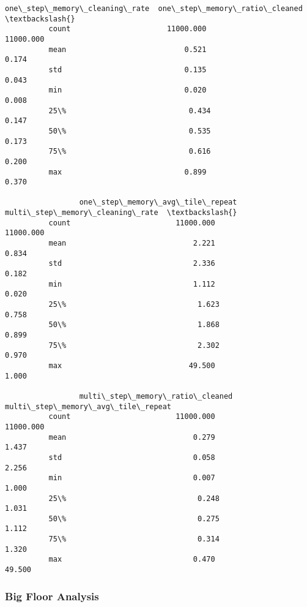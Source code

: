 \documentclass[11pt]{article}
\begin{document}
\begin{Verbatim}[commandchars=\\\{\}]
                 one\_step\_memory\_cleaning\_rate  one\_step\_memory\_ratio\_cleaned  \textbackslash{}
          count                      11000.000                      11000.000   
          mean                           0.521                          0.174   
          std                            0.135                          0.043   
          min                            0.020                          0.008   
          25\%                            0.434                          0.147   
          50\%                            0.535                          0.173   
          75\%                            0.616                          0.200   
          max                            0.899                          0.370   
          
                 one\_step\_memory\_avg\_tile\_repeat  multi\_step\_memory\_cleaning\_rate  \textbackslash{}
          count                        11000.000                        11000.000   
          mean                             2.221                            0.834   
          std                              2.336                            0.182   
          min                              1.112                            0.020   
          25\%                              1.623                            0.758   
          50\%                              1.868                            0.899   
          75\%                              2.302                            0.970   
          max                             49.500                            1.000   
          
                 multi\_step\_memory\_ratio\_cleaned  multi\_step\_memory\_avg\_tile\_repeat  
          count                        11000.000                          11000.000  
          mean                             0.279                              1.437  
          std                              0.058                              2.256  
          min                              0.007                              1.000  
          25\%                              0.248                              1.031  
          50\%                              0.275                              1.112  
          75\%                              0.314                              1.320  
          max                              0.470                             49.500  
\end{Verbatim}
            
    \subsubsection{Big Floor Analysis}
\end{document}
